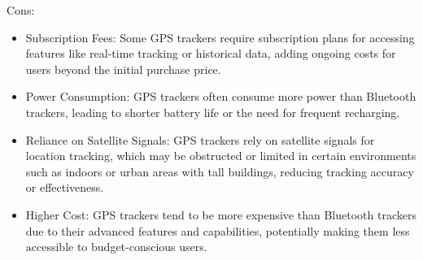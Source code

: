 Cons:
\begin{itemize}
  \item Subscription Fees: Some \ac{GPS} trackers require subscription plans for accessing features like real-time tracking or historical data, adding ongoing costs for users beyond the initial purchase price.
  \item Power Consumption: \ac{GPS} trackers often consume more power than Bluetooth trackers, leading to shorter battery life or the need for frequent recharging.
  \item Reliance on Satellite Signals: \ac{GPS} trackers rely on satellite signals for location tracking, which may be obstructed or limited in certain environments such as indoors or urban areas with tall buildings, reducing tracking accuracy or effectiveness.
  \item Higher Cost: \ac{GPS} trackers tend to be more expensive than Bluetooth trackers due to their advanced features and capabilities, potentially making them less accessible to budget-conscious users.
\end{itemize}

